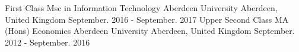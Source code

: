 

\begin{cventries}

  \cventry
    {First Class}
    {Msc in Information Technology} %
    {Aberdeen University} %
    {Aberdeen, United Kingdom} %
    {September. 2016 - September. 2017} %
  \vspace{1em} %
  \cventry
    {Upper Second Class}
    {MA (Hons) Economics } %
    {Aberdeen University} %
    {Aberdeen, United Kingdom} %
    {September. 2012 - September. 2016} %


\end{cventries}
